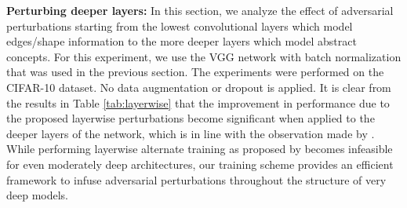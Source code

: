 \documentclass[letterpaper]{article} %
\begin{document}
\begin{center}
\label{tab:layerwise}
\end{center}

\textbf{Perturbing deeper layers:} In this section, we analyze the effect of adversarial perturbations starting from the lowest convolutional layers which model edges/shape information to the more deeper layers which model abstract concepts. For this experiment, we use the VGG network with batch normalization that was used in the previous section. The experiments were performed on the CIFAR-10 dataset. No data augmentation or dropout is applied. It is clear from the results in Table \ref{tab:layerwise} that the improvement in performance due to the proposed layerwise perturbations become significant when applied to the deeper layers of the network, which is in line with the observation made by \cite{szegedy2013intriguing}. While performing layerwise alternate training as proposed by\cite{szegedy2013intriguing}  becomes infeasible for even moderately deep architectures, our training scheme provides an efficient framework to infuse adversarial perturbations throughout the structure of very deep models.
\end{document}
